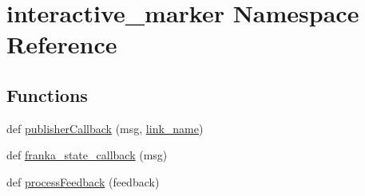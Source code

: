 \hypertarget{namespaceinteractive__marker}{}\section{interactive\+\_\+marker Namespace Reference}
\label{namespaceinteractive__marker}
\subsection*{Functions}
\begin{DoxyCompactItemize}
\item 
def \hyperlink{namespaceinteractive__marker_a151d11429957edda146dfd5184be9cc4}{publisher\+Callback} (msg, \hyperlink{namespaceinteractive__marker_ad4be871390c9720f44a629c719c96923}{link\+\_\+name})
\item 
def \hyperlink{namespaceinteractive__marker_a3ca26991be43b2dfab3662fab7d29557}{franka\+\_\+state\+\_\+callback} (msg)
\item 
def \hyperlink{namespaceinteractive__marker_a6d5c00570a7279d0c91ed3fe895d2eb3}{process\+Feedback} (feedback)
\end{DoxyCompactItemize}
